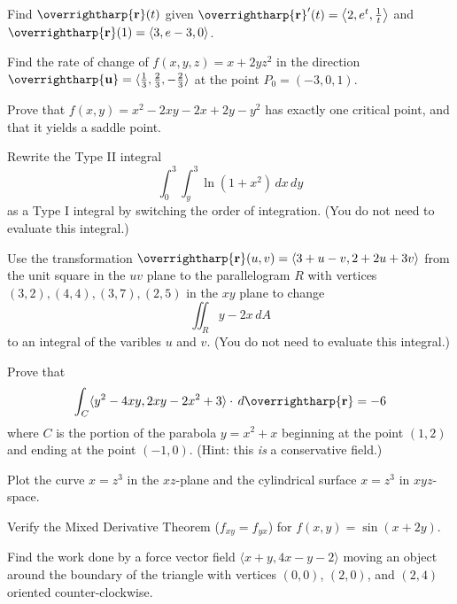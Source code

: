 \documentclass[12pt]{exam}
\newcommand{\harpvec}[1]{\overrightharp{\ensuremath{\mathbf{#1}}}}
\newcommand{\vect}[1]{\harpvec{#1}}
\newcommand{\<}{\langle}
\renewcommand{\>}{\rangle}
\begin{document}
\begin{questions}

\setcounter{question}{0}

\question[10] %
  Find \(\vect{r}(t)\) given
  \(\vect{r}'(t) = \left\<2, e^t, \frac{1}{t}\right\>\)
  and \(\vect{r}(1) = \<3, e-3, 0\>\).

\newpage

\question[10]
  Find the rate of change of $f(x,y,z)=x+2yz^2$ in the direction
  $\vect{u}=\<\frac{1}{3},\frac{2}{3},-\frac{2}{3}\>$
  at the point $P_0=(-3,0,1)$.

\newpage

\question[10]
  Prove that $f(x,y)=x^2-2xy-2x+2y-y^2$ has exactly one critical point,
  and that it yields a saddle point.

\newpage

\question[10]
  Rewrite the Type II integral
  \[
    \int_0^3\int_y^3 \ln(1+x^2) \,dx\,dy
  \]
  as a Type I integral by switching the order of integration.
  (You do not need to evaluate this integral.)

\newpage

\question[10]
  Use the transformation \(\vect{r}(u,v)=\<3+u-v,2+2u+3v\>\) from the unit
  square in the \(uv\) plane to the parallelogram \(R\) with vertices
  \((3,2),(4,4),(3,7),(2,5)\) in the \(xy\) plane to change
  \[
    \iint_R y-2x \,dA
  \]
  to an integral of the varibles \(u\) and \(v\). (You do not need to
  evaluate this integral.)

\newpage

\question[10]%
  Prove that
    \[
      \int_C \<y^2-4xy,2xy-2x^2+3\>\cdot\,d\vect{r}
        =
      -6
    \]
  where \(C\) is the portion of the parabola \(y=x^2+x\) beginning
  at the point \((1,2)\) and ending at the point
  \((-1,0)\). (Hint: this \textit{is} a conservative field.)

\newpage

\question[10]
  Plot the curve $x=z^3$ in the $xz$-plane and the
  cylindrical surface $x=z^3$ in $xyz$-space.

\newpage

\question[10]
  Verify the Mixed Derivative Theorem (\(f_{xy}=f_{yx}\)) for
  $f(x,y)=\sin(x+2y)$.

\newpage

\question[10]
  Find the work done by a force vector field $\<x+y,4x-y-2\>$ moving an
  object around the
  boundary of the triangle with vertices $(0,0)$, $(2,0)$, and
  $(2,4)$ oriented counter-clockwise.


\end{questions}
\end{document}
